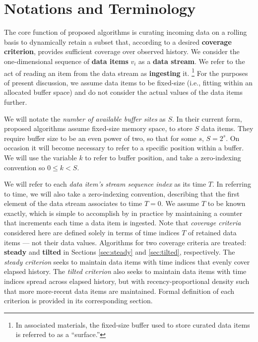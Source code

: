 \section{Notations and Terminology} \label{sec:notation}

The core function of proposed algorithms is curating incoming data on a rolling basis to dynamically retain a subset that, according to a desired \textbf{coverage criterion}, provides sufficient coverage over observed history.
We consider the one-dimensional sequence of \textbf{data items} $v_i$ as a \textbf{data stream}.
We refer to the act of reading an item from the data stream as \textbf{ingesting} it.
\footnote{%
In associated materials, the fixed-size buffer used to store curated data items is referred to as a ``surface.''%
}
For the purposes of present discussion, we assume data items to be fixed-size (i.e., fitting within an allocated buffer space) and do not consider the actual values of the data items further.

We will notate the \textit{number of available buffer sites} as $S$.
In their current form, proposed algorithms assume fixed-size memory space, to store $S$ data items.
They require buffer size to be an even power of two, so that for some $s$, $S = 2^s$.
On occasion it will become necessary to refer to a specific position within a buffer.
We will use the variable $k$ to refer to buffer position, and take a zero-indexing convention so $0 \leq k < S$.

We will refer to each \textit{data item's stream sequence index} as its time $T$.
In referring to time, we will also take a zero-indexing convention, describing that the first element of the data stream associates to time $T=0$.
We assume $T$ to be known exactly, which is simple to accomplish by in practice by maintaining a counter that increments each time a data item is ingested.
Note that \textit{coverage criteria} considered here are defined solely in terms of time indices $T$ of retained data items --- not their data values.
Algorithms for two coverage criteria are treated: \textbf{steady} and \textbf{tilted} in Sections \ref{sec:steady} and \ref{sec:tilted}, respectively.
The \textit{steady criterion} seeks to maintain data items with time indices that evenly cover elapsed history.
The \textit{tilted criterion} also seeks to maintain data items with time indices spread across elapsed history, but with recency-proportional density such that more more-recent data items are maintained.
Formal definition of each criterion is provided in its corresponding section.


